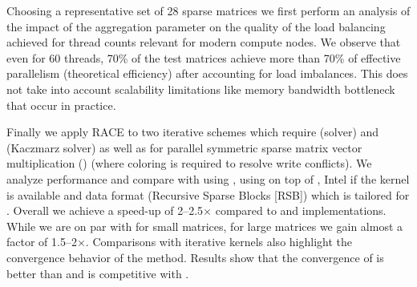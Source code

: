 Choosing a representative set of 28 sparse matrices we first perform an analysis of the impact of the aggregation parameter on the quality of the load balancing achieved for thread counts relevant for modern compute nodes. We observe that even for 60 threads, 70\% of the test matrices achieve more than 70\% of effective parallelism (theoretical efficiency) after accounting for load imbalances. This does not take into account scalability limitations like memory bandwidth bottleneck that occur in practice.

Finally we apply RACE to two iterative schemes which require \DONE (\GS solver) and \DTWO (Kaczmarz solver) as well as for parallel symmetric sparse matrix vector multiplication (\SymmSpmv)  (where \DTWO coloring is required to resolve write conflicts). We analyze \RACE performance and compare with \MC using \COLPACK, \ABMC using \COLPACK on top of \METIS, Intel \MKL if the kernel is available and data format (Recursive Sparse Blocks [RSB]) which is tailored for \SymmSpmv. Overall we achieve a speed-up of 2--2.5$\times$ compared to \MC and \MKL implementations. While we are on par with \ABMC for small matrices, for large matrices we gain almost a factor of 1.5--2$\times$. Comparisons with iterative kernels also highlight the convergence behavior of the method. Results show that the convergence of \RACE is better than \MC and is competitive with \ABMC.